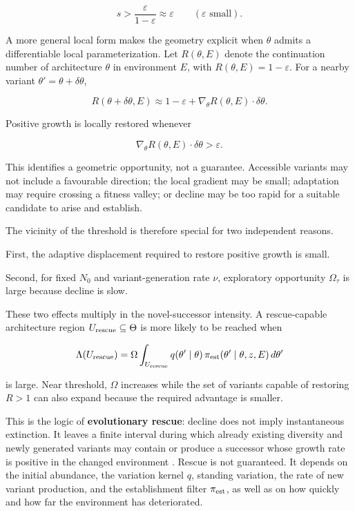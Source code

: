 \documentclass[11pt,a4paper]{article}
\begin{document}
\[
s>
\frac{\varepsilon}{1-\varepsilon}
\approx
\varepsilon
\qquad
(\varepsilon\text{ small}).
\tag{17}
\]

A more general local form makes the geometry explicit when \(\theta\)
admits a differentiable local parameterization. Let \(R(\theta,E)\)
denote the continuation number of architecture \(\theta\) in environment
\(E\), with \(R(\theta,E)=1-\varepsilon\). For a nearby variant
\(\theta'=\theta+\delta\theta\),

\[
R(\theta+\delta\theta,E)
\approx
1-\varepsilon
+
\nabla_\theta R(\theta,E)\cdot\delta\theta.
\]

Positive growth is locally restored whenever

\[
\boxed{
\nabla_\theta R(\theta,E)\cdot\delta\theta>\varepsilon.
}
\tag{18}
\]

This identifies a geometric opportunity, not a guarantee. Accessible
variants may not include a favourable direction; the local gradient may
be small; adaptation may require crossing a fitness valley; or decline
may be too rapid for a suitable candidate to arise and establish.

The vicinity of the threshold is therefore special for two independent
reasons.

First, the adaptive displacement required to restore positive growth is
small.

Second, for fixed \(N_0\) and variant-generation rate \(\nu\),
exploratory opportunity \(\Omega_\tau\) is large because decline is
slow.

These two effects multiply in the novel-successor intensity. A
rescue-capable architecture region \(U_{\rm rescue}\subseteq\Theta\) is
more likely to be reached when

\[
\Lambda(U_{\rm rescue})
=
\Omega
\int_{U_{\rm rescue}}
q(\theta'\mid\theta)\,
\pi_{\rm est}(\theta'\mid\theta,z,E)\,d\theta'
\]

is large. Near threshold, \(\Omega\) increases while the set of variants
capable of restoring \(R>1\) can also expand because the required
advantage is smaller.

This is the logic of \textbf{evolutionary rescue}: decline does not
imply instantaneous extinction. It leaves a finite interval during which
already existing diversity and newly generated variants may contain or
produce a successor whose growth rate is positive in the changed
environment \citep{Bell2017}. Rescue is not guaranteed. It depends on
the initial abundance, the variation kernel \(q\), standing variation,
the rate of new variant production, and the establishment filter
\(\pi_{\rm est}\), as well as on how quickly and how far the environment
has deteriorated.
\end{document}
